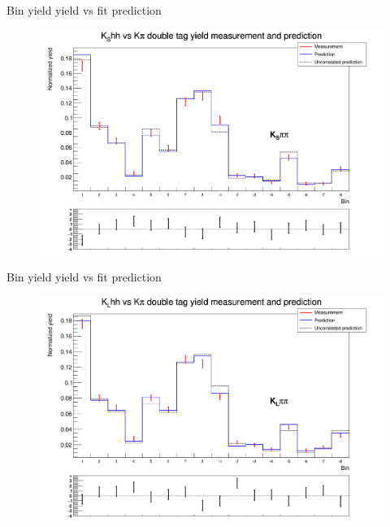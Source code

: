 \documentclass{beamer}
\begin{document}
\begin{frame}{Bin yield yield vs fit prediction}
  \begin{figure}
    \centering
    \includegraphics[width=\textwidth]{KSpipiVersusKpiYields.png}
  \end{figure}
\end{frame}

\begin{frame}{Bin yield yield vs fit prediction}
  \begin{figure}
    \centering
    \includegraphics[width=\textwidth]{KLpipiVersusKpiYields.png}
  \end{figure}
\end{frame}
\end{document}
